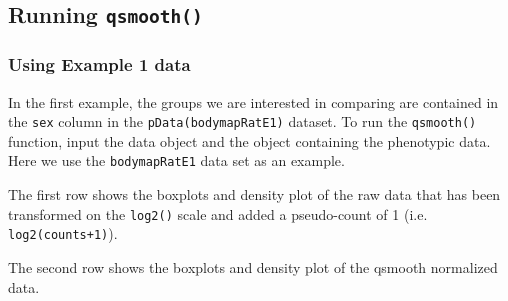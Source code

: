 \documentclass{article}
\begin{document}
\subsection{Running \texttt{qsmooth()}}

\subsubsection{Using Example 1 data}
In the first example, the groups we are interested in comparing are
contained in the \texttt{sex} column in the \texttt{pData(bodymapRatE1)}
dataset. To run the \texttt{qsmooth()} function, input the data object
and the object containing the phenotypic data. Here we use the
\texttt{bodymapRatE1} data set as an example.

The first row shows the boxplots and density plot of the raw data that
has been transformed on the \texttt{log2()} scale and added a
pseudo-count of 1 (i.e. \texttt{log2(counts+1)}).

The second row shows the boxplots and density plot of the qsmooth
normalized data.
\end{document}
